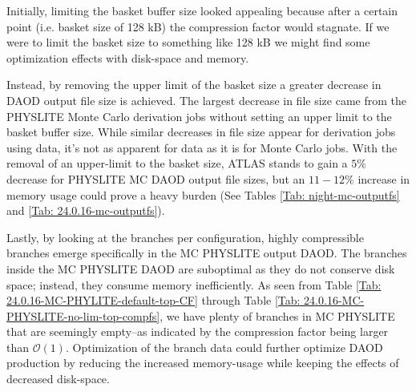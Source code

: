 


Initially, limiting the basket buffer size looked appealing because after a certain point (i.e. basket size of 128 kB) the compression factor would stagnate. 
If we were to limit the basket size to something like 128 kB we might find some optimization effects with disk-space and memory. 

Instead, by removing the upper limit of the basket size a greater decrease in DAOD output file size is achieved. 
The largest decrease in file size came from the PHYSLITE Monte Carlo derivation jobs without setting an upper limit to the basket buffer size. 
While similar decreases in file size appear for derivation jobs using data, it's not as apparent for data as it is for Monte Carlo jobs.  
With the removal of an upper-limit to the basket size, ATLAS stands to gain a $5\%$ decrease for PHYSLITE MC DAOD output file sizes, but an $11-12\%$ increase in memory usage could prove a heavy burden (See Tables \ref{Tab: night-mc-outputfs} and \ref{Tab: 24.0.16-mc-outputfs}).

Lastly, by looking at the branches per configuration, highly compressible branches emerge specifically in the MC PHYSLITE output DAOD.
The branches inside the MC PHYSLITE DAOD are suboptimal as they do not conserve disk space; instead, they consume memory inefficiently.
As seen from Table \ref{Tab: 24.0.16-MC-PHYLITE-default-top-CF} through Table \ref{Tab: 24.0.16-MC-PHYSLITE-no-lim-top-compfs}, we have plenty of branches in MC PHYSLITE that are seemingly empty--as indicated by the compression factor being larger than $\mathcal{O}(1)$.
Optimization of the branch data could further optimize DAOD production by reducing the increased memory-usage while keeping the effects of decreased disk-space. 


